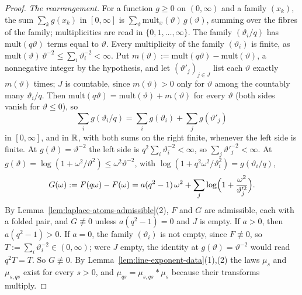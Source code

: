 \begin{proof}
\leanok
\emph{The rearrangement.} For a function $g \ge 0$ on $(0,\infty)$ and a family $(x_k)$, the sum
$\sum_kg(x_k)$ in $[0,\infty]$ is $\sum_\vartheta\mathrm{mult}_x(\vartheta)\,g(\vartheta)$, summing
over the fibres of the family; multiplicities are read in $\{0, 1, \dots, \infty\}$. The family
$(\vartheta_i/q)$ has $\mathrm{mult}(q\vartheta)$ terms equal to $\vartheta$. Every multiplicity of
the family $(\vartheta_i)$ is finite, as $\mathrm{mult}(\vartheta)\,\vartheta^{-2} \le
\sum_i\vartheta_i^{-2} < \infty$. Put
$m(\vartheta) := \mathrm{mult}(q\vartheta) - \mathrm{mult}(\vartheta)$, a nonnegative integer by
the hypothesis, and let
$(\vartheta'_j)_{j \in J}$ list each $\vartheta$ exactly $m(\vartheta)$ times; $J$ is countable,
since $m(\vartheta) > 0$ only for $\vartheta$ among the countably many $\vartheta_i/q$. Then
$\mathrm{mult}(q\vartheta) = \mathrm{mult}(\vartheta) + m(\vartheta)$ for every $\vartheta$ (both
sides vanish for $\vartheta \le 0$), so
\[
  \sum_ig(\vartheta_i/q) = \sum_ig(\vartheta_i) + \sum_jg(\vartheta'_j)
\]
in $[0,\infty]$, and in $\mathbb{R}$, with both sums on the right finite, whenever the left side is finite.
At $g(\vartheta) = \vartheta^{-2}$ the left side is $q^2\sum_i\vartheta_i^{-2} < \infty$, so
$\sum_j\vartheta'^{-2}_j < \infty$. At $g(\vartheta) = \log(1 + \omega^2/\vartheta^2) \le
\omega^2\vartheta^{-2}$, with $\log(1 + q^2\omega^2/\vartheta_i^2) = g(\vartheta_i/q)$,
\[
  G(\omega) := F(q\omega) - F(\omega)
  = a(q^2 - 1)\,\omega^2 + \sum_j\log\Bigl(1 + \frac{\omega^2}{\vartheta'^2_j}\Bigr).
\]
By Lemma~\ref{lem:laplace-atoms-admissible}(2), $F$ and $G$ are admissible, each with a folded
pair, and $G \not\equiv 0$ unless $a(q^2 - 1) = 0$ and $J$ is empty. If $a > 0$, then
$a(q^2 - 1) > 0$. If $a = 0$, the family $(\vartheta_i)$ is not empty, since $F \not\equiv 0$, so
$T := \sum_i\vartheta_i^{-2} \in (0, \infty)$; were $J$ empty, the identity at
$g(\vartheta) = \vartheta^{-2}$ would read $q^2T = T$. So $G \not\equiv 0$. By
Lemma~\ref{lem:line-exponent-data}(1),(2) the laws $\mu_s$ and $\mu_{s,qs}$ exist for every
$s > 0$, and $\mu_{qs} = \mu_{s,qs} * \mu_s$ because their transforms multiply.


\end{proof}
